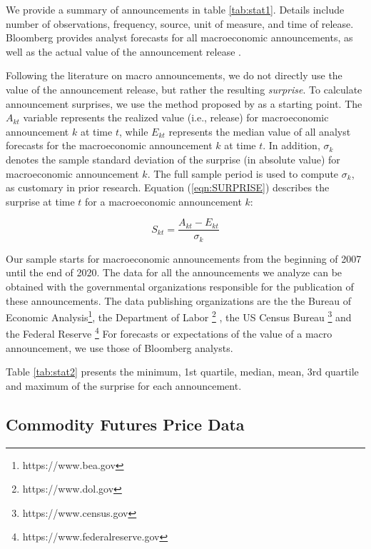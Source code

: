 \documentclass[12pt]{article}
\begin{document}
We provide a summary of announcements in table \ref{tab:stat1}. Details include number of observations, frequency, source, unit of measure, and time of release. Bloomberg provides analyst forecasts for all macroeconomic announcements, as well as the actual value of the announcement release \citep[see e.g.,][]{kurov2019price}. 

Following the literature on macro announcements, we do not directly use the value of the announcement release, but rather the resulting \emph{surprise}. To calculate announcement surprises, we use the method proposed by \citet{balduzzi2001economic} as a starting point. The  $A_{kt}$ variable represents the realized value (i.e., release) for macroeconomic announcement $k$ at time $t$, while $E_{kt}$ represents the median value of all analyst forecasts for the macroeconomic announcement $k$ at time $t$. In addition, $\sigma_k$ denotes the sample standard deviation of the surprise (in absolute value) for macroeconomic announcement $k$. The full sample period is used to compute $\sigma_k$, as customary in prior research. Equation (\ref{eqn:SURPRISE}) describes the surprise at time $t$ for a macroeconomic announcement $k$:

\begin{equation}\label{eqn:SURPRISE}
S_{kt}=\frac{A_{kt}-E_{kt}}{\sigma_k}
\end{equation}

Our sample starts for macroeconomic announcements from the beginning of 2007 until the end of 2020. The data for all the announcements we analyze can be obtained with the governmental organizations responsible for the publication of these announcements. The data publishing organizations are the the Bureau of Economic Analysis\footnote{https://www.bea.gov}, the Department of Labor \footnote{https://www.dol.gov} , the US Census Bureau \footnote{https://www.census.gov}  and the  Federal Reserve \footnote{https://www.federalreserve.gov}
For forecasts or expectations of the value of a macro announcement, we use those of Bloomberg analysts. 

Table \ref{tab:stat2} presents the minimum, 1st quartile, median, mean, 3rd quartile and maximum of the surprise for each announcement. 
\subsection{Commodity Futures Price Data}
\end{document}
